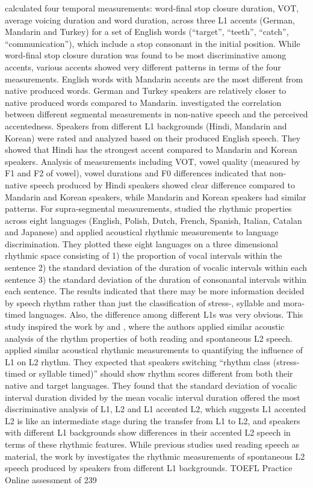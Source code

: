 \cite{arslan1997study} calculated four temporal measurements: word-final stop closure duration, VOT, average voicing duration and word duration, across three L1 accents (German, Mandarin and Turkey) for a set of English words (``target'', ``teeth'', ``catch'', ``communication''), which include a stop consonant in the initial position. While word-final stop closure duration was found to be most discriminative among accents, various accents showed very different patterns in terms of the four measurements. English words with Mandarin accents are the most different from native produced words. German and Turkey speakers are relatively closer to native produced words compared to Mandarin. \cite{mccullough2013perceived} investigated the correlation between different segmental measurements in non-native speech and the perceived accentedness. Speakers from different L1 backgrounds (Hindi, Mandarin and Korean) were rated and analyzed based on their produced English speech. They showed that Hindi has the strongest accent compared to Mandarin and Korean speakers. Analysis of measurements including VOT, vowel quality (measured by F1 and F2 of vowel), vowel durations and F0 differences indicated that non-native speech produced by Hindi speakers showed clear difference compared to Mandarin and Korean speakers, while Mandarin and Korean speakers had similar patterns. For supra-segmental measurements, \cite{ramus1999correlates} studied the rhythmic properties across eight languages (English, Polish, Dutch, French, Spanish, Italian, Catalan and Japanese) and applied acoustical rhythmic measurements to language discrimination. They plotted these eight languages on a three dimensional rhythmic space consisting of 1) the proportion of vocal intervals within the sentence 2) the standard deviation of the duration of vocalic intervals within each sentence 3) the standard deviation of the duration of consonantal intervals within each sentence. The results indicated that there may be more information decided by speech rhythm rather than just the classification of stress-, syllable and mora-timed languages. Also, the difference among different L1s was very obvious. This study inspired the work by \cite{white2007calibrating} and \cite{lai2013applying}, where the authors applied similar acoustic analysis of the rhythm properties of both reading and spontaneous L2 speech. \cite{white2007calibrating} applied similar acoustical rhythmic measurements to quantifying the influence of L1 on L2 rhythm. They expected that speakers switching ``rhythm class (stress-timed or syllable timed)'' should show rhythm scores different from both their native and target languages. They found that the standard deviation of vocalic interval duration divided by the mean vocalic interval duration offered the most discriminative analysis of L1, L2 and L1 accented L2, which suggests L1 accented L2 is like an intermediate stage during the transfer from L1 to L2, and speakers with different L1 backgrounds show differences in their accented L2 speech in terms of these rhythmic features. While previous studies used reading speech as material, the work by \cite{lai2013applying} investigates the rhythmic measurements of spontaneous L2 speech produced by speakers from different L1 backgrounds. TOEFL Practice Online assessment of 239 